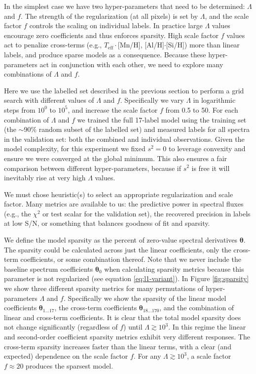 \documentclass[12pt,preprint]{aastex}
\newcommand{\Teff}{T_{\mathrm{eff}}}
\newcommand{\Dvector}[1]{\boldsymbol{#1}}
\newcommand{\vectheta}{\Dvector{\theta}}
\begin{document}
In the simplest case we have two hyper-parameters that need to be determined: 
$\Lambda$ and $f$.  The strength of the regularization (at all pixels) is set 
by $\Lambda$, and the scale factor $f$ controls the scaling on individual 
labels.  In practice large $\Lambda$ values encourage zero coefficients and thus enforces sparsity.  High scale factor $f$
values act to penalize cross-terms (e.g., $\Teff\cdot$[Mn/H], [Al/H]$\cdot$[Si/H]) more than linear labels, and produce sparse
models as a consequence.  Because these hyper-parameters act in conjunction 
with each other, we need to explore many combinations of $\Lambda$ and $f$.


Here we use the labelled set described in the previous section to perform a
grid search with different values of $\Lambda$ and $f$.  Specifically we vary 
$\Lambda$ in logarithmic steps from $10^0$ to $10^5$, and increase the 
scale factor $f$ from 0.5 to 50.  For each combination of $\Lambda$ and $f$ we 
trained the full 17-label model using the training set (the $\sim$90\% random
subset of the labelled set) and measured labels for all spectra in the
validation set: both the combined and individual observations.  Given the model
complexity, for this experiment we fixed $s^2 = 0$ to leverage convexity
and ensure we were converged at the global minimum.  This also ensures a fair
comparison between different hyper-parameters, because if $s^2$ is free it
will inevitably rise at very high $\Lambda$ values.  


We must chose heuristic(s) to select an appropriate regularization and scale
factor.  Many metrics are available to us: the predictive power in spectral
fluxes (e.g., the $\chi^2$ or test scalar for the validation set), the 
recovered precision in labels at low S/N, or something that balances goodness of fit and sparsity.


We define the model sparsity as the percent of zero-value spectral derivatives 
$\vectheta$.  The sparsity could be calculated across just the linear 
coefficients, only the cross-term coefficients, or some combination thereof.  
Note that we never include the baseline spectrum coefficients $\vectheta_0$ when 
calculating sparsity metrics because this parameter is not regularized (see 
equation \ref{eq:l1-variant}).  In Figure \ref{fig:sparsity} we show three 
different sparsity metrics for many permutations of hyper-parameters $\Lambda$ 
and $f$.  Specifically we show the sparsity of the linear model coefficients 
$\vectheta_{1...17}$, the cross-term coefficients $\vectheta_{18...170}$, and 
the combination of linear and cross-term coefficients.  It is clear that the 
total model sparsity does not change significantly (regardless of $f$) until 
$\Lambda \gtrsim 10^3$.  In this regime the linear and second-order coefficient 
sparsity metrics exhibit very different responses.  The cross-term sparsity 
increases faster than the linear terms, with a clear (and expected) dependence 
on the scale factor $f$.  For any $\Lambda \gtrsim 10^3$, a scale factor 
$f \approx 20$ produces the sparsest model.
\end{document}
